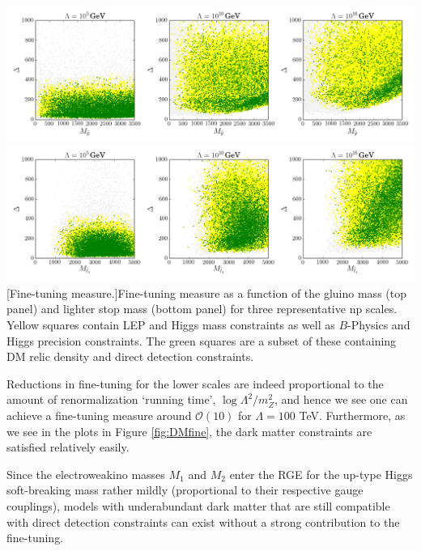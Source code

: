 \begin{center}
\includegraphics[scale=0.4]{figures/plot_mglu.png}
\includegraphics[scale=0.4]{figures/plot_mt1.png}
[Fine-tuning measure.]{Fine-tuning measure as a function of the gluino mass (top panel) and lighter stop mass (bottom panel) for three representative \acrshort{np} scales. Yellow squares contain LEP and Higgs mass constraints as well as $B$-Physics and Higgs precision constraints. The green squares are a subset of these containing DM relic density and direct detection constraints.}
\label{fig:generalfine}
\end{center}

Reductions in fine-tuning for the lower scales are indeed proportional to the amount of renormalization `running time', $\log \Lambda^2/m^2_Z$, and hence we see one can achieve a fine-tuning measure around $\mathcal{O}(10)$ for $\Lambda=100$ TeV. Furthermore, as we see in the plots in Figure \ref{fig:DMfine}, the dark matter constraints are satisfied relatively easily.

Since the electroweakino masses $M_1$ and $M_2$ enter the RGE for the up-type Higgs soft-breaking mass rather mildly (proportional to their respective gauge couplings), models with underabundant dark matter that are still compatible with direct detection constraints can exist without a strong contribution to the fine-tuning.

